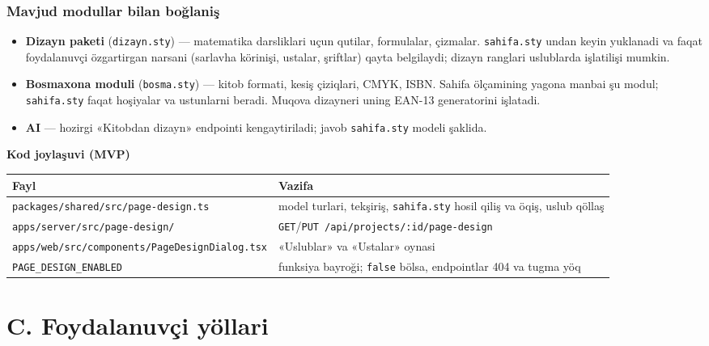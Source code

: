 \documentclass[11pt]{article}
\begin{document}
\section{Mavjud modullar bilan boğlaniş}\label{sec:tl-integratsiya}
\begin{itemize}
\item \textbf{Dizayn paketi} (\texttt{dizayn.sty}) --- matematika darsliklari uçun qutilar, formulalar, çizmalar. \texttt{sahifa.sty} undan keyin yuklanadi va faqat foydalanuvçi özgartirgan narsani (sarlavha körinişi, ustalar, şriftlar) qayta belgilaydi; dizayn ranglari uslublarda işlatilişi mumkin.
\item \textbf{Bosmaxona moduli} (\texttt{bosma.sty}) --- kitob formati, kesiş çiziqlari, CMYK, ISBN. Sahifa ölçamining yagona manbai şu modul; \texttt{sahifa.sty} faqat hoşiyalar va ustunlarni beradi. Muqova dizayneri uning EAN-13 generatorini işlatadi.
\item \textbf{AI} --- hozirgi «Kitobdan dizayn» endpointi kengaytiriladi; javob \texttt{sahifa.sty} modeli şaklida.
\end{itemize}

\textbf{Kod joylaşuvi (MVP)}
\begin{center}\footnotesize
\begin{tabularx}{\linewidth}{>{\raggedright\arraybackslash}p{78mm}X}
\toprule
Fayl & Vazifa\\
\midrule
\texttt{packages/shared/src/page-design.ts} & model turlari, tekşiriş, \texttt{sahifa.sty} hosil qiliş va öqiş, uslub qöllaş\\
\texttt{apps/server/src/page-design/} & \texttt{GET}/\texttt{PUT /api/projects/:id/page-design}\\
\texttt{apps/web/src/components/PageDesignDialog.tsx} & «Uslublar» va «Ustalar» oynasi\\
\texttt{PAGE\_DESIGN\_ENABLED} & funksiya bayroği; \texttt{false} bölsa, endpointlar 404 va tugma yöq\\
\bottomrule
\end{tabularx}
\end{center}

\part*{C. Foydalanuvçi yöllari}
\end{document}
